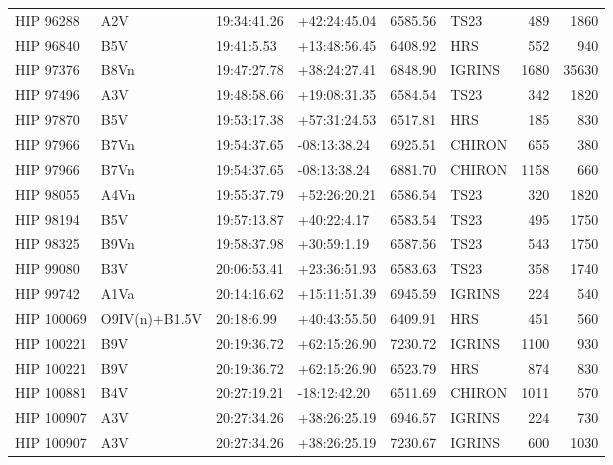 \documentclass{emulateapj}
\begin{document}
\begin{longtable*}{|l|lllrlrr|}
   HIP 96288 &            A2V &    19:34:41.26 &   +42:24:45.04 &  6585.56 &       TS23 &      489 &    1860 \\
   HIP 96840 &            B5V &     19:41:5.53 &   +13:48:56.45 &  6408.92 &        HRS &      552 &     940 \\
   HIP 97376 &           B8Vn &    19:47:27.78 &   +38:24:27.41 &  6848.90 &     IGRINS &     1680 &   35630 \\
   HIP 97496 &            A3V &    19:48:58.66 &   +19:08:31.35 &  6584.54 &       TS23 &      342 &    1820 \\
   HIP 97870 &            B5V &    19:53:17.38 &   +57:31:24.53 &  6517.81 &        HRS &      185 &     830 \\
   HIP 97966 &           B7Vn &    19:54:37.65 &   -08:13:38.24 &  6925.51 &     CHIRON &      655 &     380 \\
   HIP 97966 &           B7Vn &    19:54:37.65 &   -08:13:38.24 &  6881.70 &     CHIRON &     1158 &     660 \\
   HIP 98055 &           A4Vn &    19:55:37.79 &   +52:26:20.21 &  6586.54 &       TS23 &      320 &    1820 \\
   HIP 98194 &            B5V &    19:57:13.87 &    +40:22:4.17 &  6583.54 &       TS23 &      495 &    1750 \\
   HIP 98325 &           B9Vn &    19:58:37.98 &    +30:59:1.19 &  6587.56 &       TS23 &      543 &    1750 \\
   HIP 99080 &            B3V &    20:06:53.41 &   +23:36:51.93 &  6583.63 &       TS23 &      358 &    1740 \\
   HIP 99742 &           A1Va &    20:14:16.62 &   +15:11:51.39 &  6945.59 &     IGRINS &      224 &     540 \\
  HIP 100069 &  O9IV(n)+B1.5V &     20:18:6.99 &   +40:43:55.50 &  6409.91 &        HRS &      451 &     560 \\
  HIP 100221 &            B9V &    20:19:36.72 &   +62:15:26.90 &  7230.72 &     IGRINS &     1100 &     930 \\
  HIP 100221 &            B9V &    20:19:36.72 &   +62:15:26.90 &  6523.79 &        HRS &      874 &     830 \\
  HIP 100881 &            B4V &    20:27:19.21 &   -18:12:42.20 &  6511.69 &     CHIRON &     1011 &     570 \\
  HIP 100907 &            A3V &    20:27:34.26 &   +38:26:25.19 &  6946.57 &     IGRINS &      224 &     730 \\
  HIP 100907 &            A3V &    20:27:34.26 &   +38:26:25.19 &  7230.67 &     IGRINS &      600 &    1030 \\

\end{longtable*}
\end{document}
